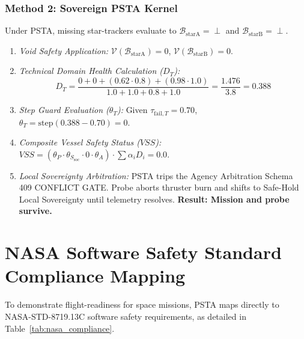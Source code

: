 \documentclass[journal]{IEEEtran}
\begin{document}
\subsubsection{Method 2: Sovereign PSTA Kernel}
Under PSTA, missing star-trackers evaluate to $\mathcal{B}_{\text{starA}} = \perp$ and $\mathcal{B}_{\text{starB}} = \perp$.
\begin{enumerate}
    \item \emph{Void Safety Application:} $\mathcal{V}(\mathcal{B}_{\text{starA}}) = 0$, $\mathcal{V}(\mathcal{B}_{\text{starB}}) = 0$.
    \item \emph{Technical Domain Health Calculation ($D_T$):}
    \begin{equation}
    D_T = \frac{0 + 0 + (0.62 \cdot 0.8) + (0.98 \cdot 1.0)}{1.0 + 1.0 + 0.8 + 1.0} = \frac{1.476}{3.8} = 0.388
    \end{equation}
    \item \emph{Step Guard Evaluation ($\theta_T$):} Given $\tau_{\text{fail}, T} = 0.70$, $\theta_T = \text{step}(0.388 - 0.70) = 0$.
    \item \emph{Composite Vessel Safety Status ($VSS$):} $VSS = (\theta_P \cdot \theta_{S_{\text{soc}}} \cdot 0 \cdot \theta_A) \cdot \sum \alpha_i D_i = 0.0$.
    \item \emph{Local Sovereignty Arbitration:} PSTA trips the Agency Arbitration Schema 409 CONFLICT GATE. Probe aborts thruster burn and shifts to Safe-Hold Local Sovereignty until telemetry resolves. \textbf{Result: Mission and probe survive.}
\end{enumerate}

\section{NASA Software Safety Standard Compliance Mapping}

To demonstrate flight-readiness for space missions, PSTA maps directly to NASA-STD-8719.13C software safety requirements, as detailed in Table~\ref{tab:nasa_compliance}.
\end{document}
